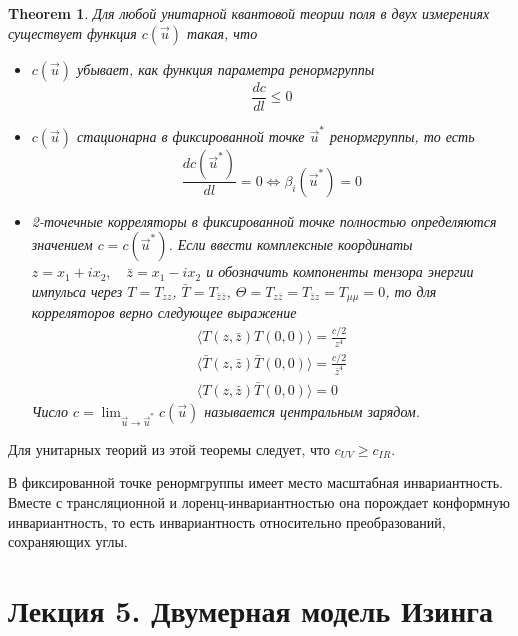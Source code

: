 \documentclass[a4paper,12pt]{article}
\newtheorem{theorem}{Theorem}
\theoremstyle{definition}
\theoremstyle{definition}
\theoremstyle{definition}
\begin{document}
\begin{theorem}
  Для любой унитарной квантовой теории поля в двух измерениях существует функция $c(\vec u)$ такая, что
  \label{c-theorem}
  \begin{itemize}
  \item $c(\vec u)$ убывает, как функция параметра ренормгруппы
    \begin{equation}
      \label{eq:95}
      \frac{dc}{dl}\leq 0
    \end{equation}
  \item $c(\vec u)$ стационарна в фиксированной точке $\vec u^*$ ренормгруппы, то есть
    \begin{equation}
      \label{eq:96}
      \frac{dc({\vec u^*})}{dl}=0 \Leftrightarrow \beta_i(\vec u^*)=0
    \end{equation}
  \item 2-точечные корреляторы в фиксированной точке полностью определяются значением $c=c(\vec u^*)$.
    Если ввести комплексные координаты $z=x_1+ix_2,\quad \bar z=x_1-ix_2$ и обозначить компоненты тензора энергии импульса через $T=T_{zz}$, $\bar T=T_{\bar z\bar z}$, $\Theta=T_{z\bar z}=T_{\bar z z}=T_{\mu\mu}=0$, то для корреляторов верно следующее выражение
    \begin{eqnarray}
      \label{eq:97}
      \langle T(z,\bar z)T(0,0)\rangle=\frac{c/2}{z^4}\\
      \langle \bar T(z,\bar z)\bar T(0,0)\rangle=\frac{c/2}{\bar z^4}\\
      \langle T(z,\bar z) \bar T(0,0)\rangle=0
    \end{eqnarray}
    Число $c=\lim_{\vec u\to \vec u^*} c(\vec u)$ называется центральным зарядом. 
  \end{itemize}
\end{theorem}
Для унитарных теорий из этой теоремы следует, что $c_{UV}\geq c_{IR}$.

В фиксированной точке ренормгруппы имеет место масштабная инвариантность. Вместе с трансляционной и лоренц-инвариантностью она порождает конформную инвариантность, то есть инвариантность относительно преобразований, сохраняющих углы.

\section{Лекция 5. Двумерная модель Изинга}
\label{sec:lecture-5}
\end{document}
